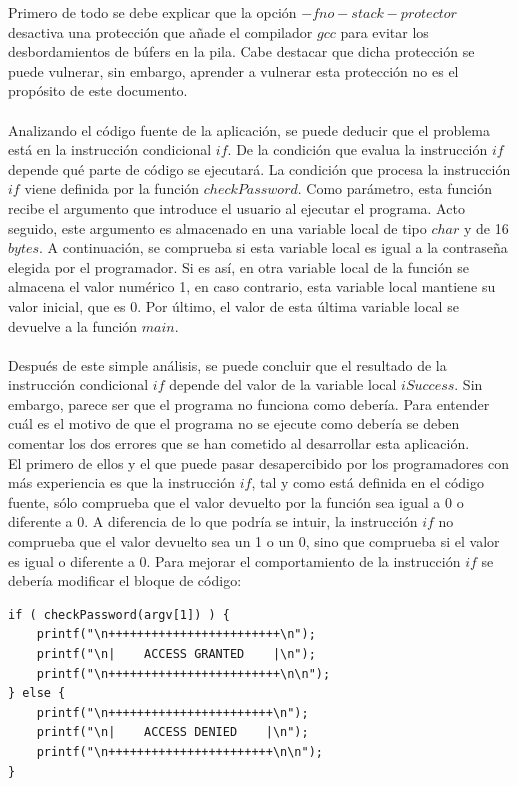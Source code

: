 \documentclass [titlepage, 12pt]{article}
\begin{document}
Primero de todo se debe explicar que la opci\'on $-fno-stack-protector$ desactiva una protecci\'on que a\~nade el compilador $gcc$ para evitar los desbordamientos de b\'ufers en la pila. Cabe destacar que dicha protecci\'on se puede vulnerar, sin embargo, aprender a vulnerar esta protecci\'on no es el prop\'osito de este documento.\\
\\
Analizando el c\'odigo fuente de la aplicaci\'on, se puede deducir que el problema est\'a en la instrucci\'on condicional $if$. De la condici\'on que evalua la instrucci\'on $if$ depende qu\'e parte de c\'odigo se ejecutar\'a. La condici\'on que procesa la instrucci\'on $if$ viene definida por la funci\'on $checkPassword$. Como par\'ametro, esta funci\'on recibe el argumento que introduce el usuario al ejecutar el programa. Acto seguido, este argumento es almacenado en una variable local de tipo $char$ y de 16 $bytes$. A continuaci\'on, se comprueba si esta variable local es igual a la contrase\~na elegida por el programador. Si es as\'i, en otra variable local de la funci\'on se almacena el valor num\'erico 1, en caso contrario, esta variable local mantiene su valor inicial, que es 0. Por \'ultimo, el valor de esta \'ultima variable local se devuelve a la funci\'on $main$.\\
\\
Despu\'es de este simple an\'alisis, se puede concluir que el resultado de la instrucci\'on condicional $if$ depende del valor de la variable local $iSuccess$. Sin embargo, parece ser que el programa no funciona como deber\'ia. Para entender cu\'al es el motivo de que el programa no se ejecute como deber\'ia se deben comentar los dos errores que se han cometido al desarrollar esta aplicaci\'on. \\

El primero de ellos y el que puede pasar desapercibido por los programadores con m\'as experiencia es que la instrucci\'on $if$, tal y como est\'a definida en el c\'odigo fuente, s\'olo comprueba que el valor devuelto por la funci\'on sea igual a 0 o diferente a 0. A diferencia de lo que podr\'ia se intuir, la instrucci\'on $if$ no comprueba que el valor devuelto sea un 1 o un 0, sino que comprueba si el valor es igual o diferente a 0. Para mejorar el comportamiento de la instrucci\'on $if$ se deber\'ia modificar el bloque de c\'odigo:

\lstset{language=C++,caption=C\'odigo amb\'iguo,label=fig:codigoAmbiguo}
\begin{lstlisting}
if ( checkPassword(argv[1]) ) {
	printf("\n++++++++++++++++++++++++\n");
	printf("\n|    ACCESS GRANTED    |\n");
	printf("\n++++++++++++++++++++++++\n\n");
} else {
	printf("\n+++++++++++++++++++++++\n");
	printf("\n|    ACCESS DENIED    |\n");
	printf("\n+++++++++++++++++++++++\n\n");
}
\end{lstlisting}
\end{document}
